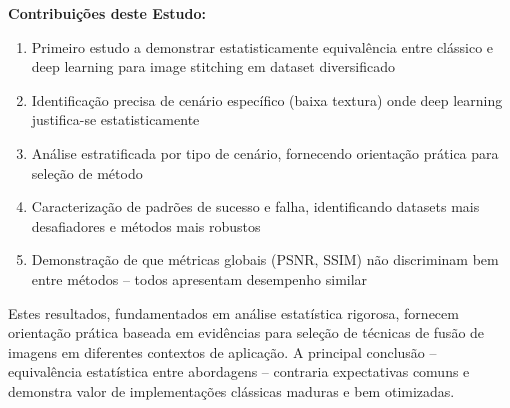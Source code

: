 \textbf{Contribuições deste Estudo:}

\begin{enumerate}
    \item Primeiro estudo a demonstrar estatisticamente equivalência entre clássico e deep learning para image stitching em dataset diversificado

    \item Identificação precisa de cenário específico (baixa textura) onde deep learning justifica-se estatisticamente

    \item Análise estratificada por tipo de cenário, fornecendo orientação prática para seleção de método

    \item Caracterização de padrões de sucesso e falha, identificando datasets mais desafiadores e métodos mais robustos

    \item Demonstração de que métricas globais (PSNR, SSIM) não discriminam bem entre métodos -- todos apresentam desempenho similar
\end{enumerate}

Estes resultados, fundamentados em análise estatística rigorosa, fornecem orientação prática baseada em evidências para seleção de técnicas de fusão de imagens em diferentes contextos de aplicação. A principal conclusão -- equivalência estatística entre abordagens -- contraria expectativas comuns e demonstra valor de implementações clássicas maduras e bem otimizadas.

